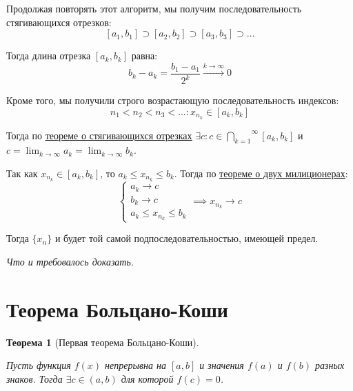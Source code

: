 \documentclass[a4paper,12pt,oneside]{extbook}
\newcommand{\newpar}{$ $\par\nobreak\ignorespaces}
\theoremstyle{numbered}
\theoremstyle{unnumbered}
\theoremstyle{named}
\newtheorem{theorem}{Теорема}[section]
\theoremstyle{unnumbered}
\theoremstyle{named}
\theoremstyle{named}
\theoremstyle{named}
\renewenvironment{proof}[1][]{\breakenv[Доказательство]{\if\relax\detokenize{#1}\relax\else\;\fi}{\textbf{#1}}}{\smallskip\newpar \hfill\textit{Что и требовалось доказать.}}
\newcommand{\plink}[2]{\hyperref[#1]{\color{blue}\underline{#2}}}
\begin{document}
\begin{proof}
    Продолжая повторять этот алгоритм, мы получим последовательность стягивающихся отрезков:
    \[
        [a_1, b_1] \supset [a_2, b_2] \supset [a_3, b_3] \supset \ldots
    \]

    Тогда длина отрезка \([a_k, b_k]\) равна:
    \[
        b_k - a_k = \frac{b_1 - a_1}{2^k} \overset{k \rightarrow \infty}{\longrightarrow} 0
    \]

    Кроме того, мы получили строго возрастающую последовательность индексов:
    \[
        n_1 < n_2 < n_3 < \ldots : x_{n_k} \in [a_k, b_k]
    \]

    Тогда по \plink{sec:Теорема Коши-Кантора о стягивающихся отрезках}{теореме о стягивающихся отрезках} \(\exists c: c \in \overset{\infty}{\underset{k = 1}{\bigcap}} [a_k, b_k]\) и \(\displaystyle c = \lim_{k \rightarrow \infty}{a_k} = \lim_{k \rightarrow \infty}{b_k}\).

    Так как \(x_{n_k} \in [a_k, b_k]\), то \(a_k \leq x_{n_k} \leq b_k\). Тогда по \plink{sub:Теорема о двух милиционерах}{теореме о двух милиционерах}:
    \[
        \begin{cases}
            a_k \rightarrow c \\
            b_k \rightarrow c \\
            a_k \leq x_{n_k} \leq b_k
        \end{cases}
        \implies
        x_{n_k} \rightarrow c
    \]

    Тогда \(\{x_n\}\) и будет той самой подпоследовательностью, имеющей предел.
\end{proof}

\section{Теорема Больцано-Коши}%
\label{sec:Теорема Больцано-Коши}

\begin{theorem}[Первая теорема Больцано-Коши]
    \newpar
    Пусть функция \(f(x)\) непрерывна на \([a, b]\) и значения \(f(a)\) и \(f(b)\) разных знаков. Тогда \(\exists c \in (a, b)\) для которой \(f(c) = 0\).
\end{theorem}
\end{document}
